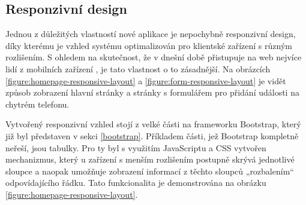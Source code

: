 \subsection{Responzivní design}
Jednou z důležitých vlastností nové aplikace je nepochybně responzivní design, díky kterému je vzhled systému optimalizován pro klientské zařízení s různým rozlišením. S ohledem na skutečnost, že v dnešní době přistupuje na web nejvíce lidí z mobilních zařízení \cite{deviceusage}, je tato vlastnost o to zásadnější. Na obrázcích \ref{figure:homepage-responsive-layout} a \ref{figure:form-responsive-layout} je vidět způsob zobrazení hlavní stránky a stránky s formulářem pro přidání události na chytrém telefonu.

Vytvořený responzivní vzhled stojí z velké části na frameworku Bootstrap, který již byl představen v sekci \ref{bootstrap}. Příkladem části, jež Bootstrap kompletně neřeší, jsou tabulky. Pro ty byl s využitím JavaScriptu a CSS vytvořen mechanizmus, který u zařízení s menším rozlišením postupně skrývá jednotlivé sloupce a naopak umožňuje zobrazení informací z těchto sloupců „rozbalením“ odpovídajícího řádku. Tato funkcionalita je demonstrována na obrázku \ref{figure:homepage-responsive-layout}.

